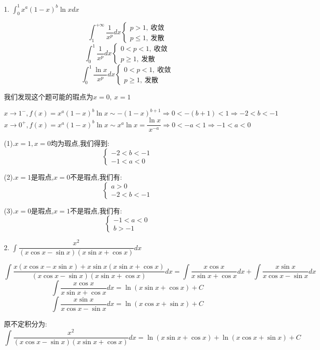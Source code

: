 1. $\int_{0}^{1}x^{a}(1-x)^{b}\ln xdx$
\begin{lemma}[特殊反常积分]\label{lem: 特殊反常积分}
	
	$$\int_{1}^{+\infty}\dfrac{1}{x^p}dx\left\lbrace 
	\begin{array}{l}
		p>1,\ \text{收敛}\\
		p\leq 1,\ \text{发散}
	\end{array}
	\right. $$
	$$\int_{0}^{1}\dfrac{1}{x^p}dx\left\lbrace 
	\begin{array}{l}
		0<p<1,\ \text{收敛}\\
		p\geq 1,\ \text{发散}
	\end{array}
	\right. $$
	$$\int_{0}^{1}\dfrac{\ln x}{x^p}dx\left\lbrace 
	\begin{array}{l}
		0<p<1,\ \text{收敛}\\
		p\geq 1,\ \text{发散}
	\end{array}
	\right. $$
\end{lemma}
\begin{solution}
	
	我们发现这个题可能的瑕点为$x=0,\ x=1$
	
	$$x\rightarrow 1^{-},f(x)=x^a(1-x)^b\ln x\sim -(1-x)^{b+1}\Rightarrow 0<-(b+1)<1\Rightarrow -2<b<-1$$
	$$x\rightarrow 0^{+},f(x)=x^a(1-x)^b\ln x\sim x^a\ln x=\dfrac{\ln x}{x^{-a}}\Rightarrow 0<-a<1\Rightarrow -1<a<0$$
	
	(1).$x=1,x=0$均为瑕点,我们得到: 
	$$\left\lbrace 
	\begin{array}{l}
		-2<b<-1\\
		-1<a<0
	\end{array}
	\right. $$
	
	(2).$x=1$是瑕点,$x=0$不是瑕点,我们有: 
	$$\left\lbrace 
	\begin{array}{l}
		a>0\\-2<b<-1
	\end{array}
	\right. $$
	
	(3).$x=0$是瑕点,$x=1$不是瑕点,我们有: 
	$$\left\lbrace 
	\begin{array}{l}
		-1<a<0\\b>-1
	\end{array}
	\right. $$
\end{solution}

2. $\int\dfrac{x^2}{(x\cos x-\sin x)(x\sin x+\cos x)}dx$
\begin{solution}
	
	$$\int\frac{x(x\cos x-x\sin x)+x\sin x(x\sin x+\cos x)}{(x\cos x-\sin x)(x\sin x+\cos x)}dx=\int\frac{x\cos x}{x\sin x+\cos x}dx+\int\frac{x\sin x}{x\cos x-\sin x}dx$$
	$$\int\frac{x\cos x}{x\sin x+\cos x}dx=\ln(x\sin x+\cos x)+C$$
	$$\int\frac{x\sin x}{x\cos x-\sin x}dx=\ln(x\cos x+\sin x)+C$$
	
	原不定积分为: 
	$$\int\frac{x^2}{(x\cos x-\sin x)(x\sin x+\cos x)}dx=\ln(x\sin x+\cos x)+\ln(x\cos x+\sin x)+C$$
\end{solution}


